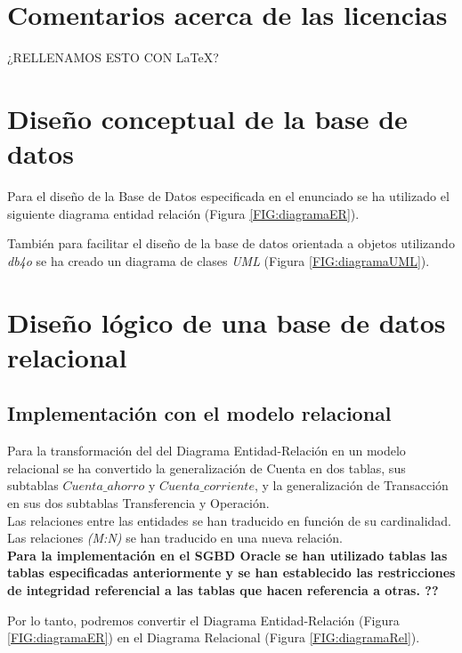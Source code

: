 \documentclass{article}
\begin{document}
\section{Comentarios acerca de las licencias}

\begin{Huge}
	¿RELLENAMOS ESTO CON \LaTeX?
\end{Huge}

\section{Diseño conceptual de la base de datos}

Para el diseño de la Base de Datos especificada en el enunciado se ha utilizado el siguiente diagrama entidad relación (Figura \ref{FIG:diagramaER}).

También para facilitar el diseño de la base de datos orientada a objetos utilizando \emph{db4o} se ha creado un diagrama de clases \emph{UML} (Figura \ref{FIG:diagramaUML}).



\section{Diseño lógico de una base de datos relacional}

\subsection{Implementación con el modelo relacional}

Para la transformación del del Diagrama Entidad-Relación en un modelo relacional se ha convertido la generalización de Cuenta en dos tablas, sus subtablas $Cuenta\_ahorro$ y $Cuenta\_corriente$, y la generalización de Transacción en sus dos subtablas Transferencia y Operación.\\

Las relaciones entre las entidades se han traducido en función de su cardinalidad. Las relaciones \emph{(M:N)} se han traducido en una nueva relación.\\

\textbf{Para la implementación en el SGBD Oracle se han utilizado tablas las tablas especificadas anteriormente y se han establecido las restricciones de integridad referencial a las tablas que hacen referencia a otras. ??}

Por lo tanto, podremos convertir el Diagrama Entidad-Relación (Figura \ref{FIG:diagramaER}) en el Diagrama Relacional (Figura \ref{FIG:diagramaRel}).
\end{document}
